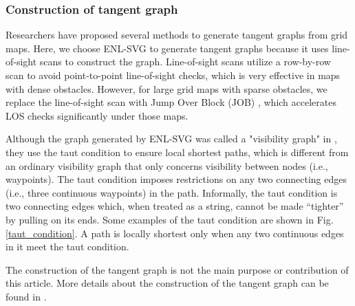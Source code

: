 \documentclass[letterpaper, 10 pt, journal, twoside]{IEEEtran}
\begin{document}
\subsubsection{Construction of tangent graph}

Researchers have proposed several methods \cite{liu1991proposal, yao2019reinforcedrimjump, oh2017edge} to generate tangent graphs from grid maps. Here, we choose ENL-SVG \cite{oh2017edge} to generate tangent graphs because it uses line-of-sight scans to construct the graph. Line-of-sight scans utilize a row-by-row scan to avoid point-to-point line-of-sight checks, which is very effective in maps with dense obstacles. However, for large grid maps with sparse obstacles, we replace the line-of-sight scan with Jump Over Block (JOB) \cite{10266687}, which accelerates LOS checks significantly under those maps.

Although the graph generated by ENL-SVG \cite{oh2017edge} was called a "visibility graph" in \cite{oh2017edge}, they use the taut condition to ensure local shortest paths, which is different from an ordinary visibility graph that only concerns visibility between nodes (i.e., waypoints). The taut condition imposes restrictions on any two connecting edges (i.e., three continuous waypoints) in the path. Informally, the taut condition is two connecting edges which, when treated as a string, cannot be made “tighter” by pulling on its ends. Some examples of the taut condition are shown in Fig. \ref{taut_condition}. A path is locally shortest only when any two continuous edges in it meet the taut condition.

The construction of the tangent graph is not the main purpose or contribution of this article. More details about the construction of the tangent graph can be found in \cite{oh2017edge}.
\end{document}
